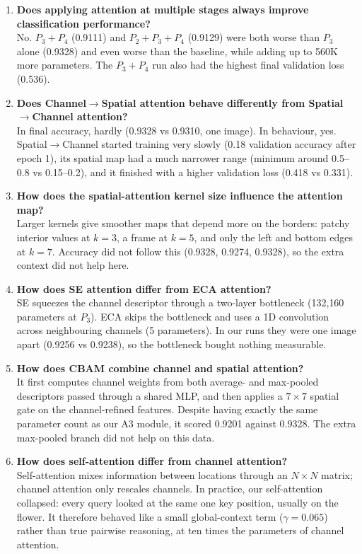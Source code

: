 \documentclass[10pt]{article}
\begin{document}
\begin{enumerate}
\item \textbf{Does applying attention at multiple stages always improve classification performance?}\\
No. $P_3+P_4$ (0.9111) and $P_2+P_3+P_4$ (0.9129) were both worse than
$P_3$ alone (0.9328) and even worse than the baseline, while adding up to 560K
more parameters. The $P_3+P_4$ run also had the highest final validation loss
(0.536).

\item \textbf{Does Channel$\rightarrow$Spatial attention behave differently from Spatial$\rightarrow$Channel attention?}\\
In final accuracy, hardly (0.9328 vs 0.9310, one image). In behaviour,
yes. Spatial$\rightarrow$Channel started training very slowly (0.18 validation
accuracy after epoch 1), its spatial map had a much narrower range (minimum around
0.5--0.8 vs 0.15--0.2), and it finished with a higher validation loss (0.418 vs
0.331).

\item \textbf{How does the spatial-attention kernel size influence the attention map?}\\
Larger kernels give smoother maps that depend more on the borders: patchy
interior values at $k=3$, a frame at $k=5$, and only the left and bottom edges at
$k=7$. Accuracy did not follow this (0.9328, 0.9274, 0.9328), so the extra
context did not help here.

\item \textbf{How does SE attention differ from ECA attention?}\\
SE squeezes the channel descriptor through a two-layer bottleneck
(132{,}160 parameters at $P_3$). ECA skips the bottleneck and uses a 1D
convolution across neighbouring channels (5 parameters). In our runs they were one
image apart (0.9256 vs 0.9238), so the bottleneck bought nothing measurable.

\item \textbf{How does CBAM combine channel and spatial attention?}\\
It first computes channel weights from both average- and max-pooled
descriptors passed through a shared MLP, and then applies a $7\times7$ spatial
gate on the channel-refined features. Despite having exactly the same parameter
count as our A3 module, it scored 0.9201 against 0.9328. The extra max-pooled
branch did not help on this data.

\item \textbf{How does self-attention differ from channel attention?}\\
Self-attention mixes information between locations through an
$N\times N$ matrix; channel attention only rescales channels. In practice, our
self-attention collapsed: every query looked at the same one key position, usually
on the flower. It therefore behaved like a small global-context term
($\gamma=0.065$) rather than true pairwise reasoning, at ten times the parameters
of channel attention.


\end{enumerate}
\end{document}

